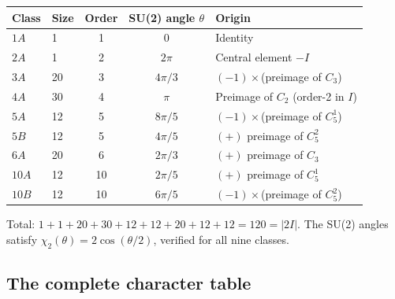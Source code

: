 \documentclass[11pt,a4paper]{article}
\theoremstyle{definition}
\theoremstyle{remark}
\begin{document}
\begin{center}
\renewcommand{\arraystretch}{1.35}
\begin{tabular}{llccl}
\toprule
Class & Size & Order & SU(2) angle $\theta$ & Origin \\
\midrule
$1A$ & 1  & 1  & $0$            & Identity \\
$2A$ & 1  & 2  & $2\pi$         & Central element $-I$ \\
$3A$ & 20 & 3  & $4\pi/3$       & $(-1)\times$(preimage of $C_3$) \\
$4A$ & 30 & 4  & $\pi$          & Preimage of $C_2$ (order-2 in $I$) \\
$5A$ & 12 & 5  & $8\pi/5$       & $(-1)\times$(preimage of $C_5^1$) \\
$5B$ & 12 & 5  & $4\pi/5$       & $(+)$ preimage of $C_5^2$ \\
$6A$ & 20 & 6  & $2\pi/3$       & $(+)$ preimage of $C_3$ \\
$10A$& 12 & 10 & $2\pi/5$       & $(+)$ preimage of $C_5^1$ \\
$10B$& 12 & 10 & $6\pi/5$       & $(-1)\times$(preimage of $C_5^2$) \\
\bottomrule
\end{tabular}
\end{center}
\noindent
Total: $1+1+20+30+12+12+20+12+12=120=|2I|$.
The SU(2) angles satisfy $\chi_2(\theta) = 2\cos(\theta/2)$, verified for
all nine classes.

\subsection{The complete character table}
\end{document}
